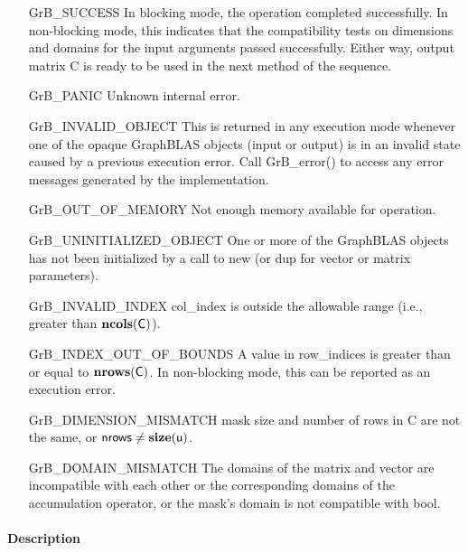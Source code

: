 \begin{itemize}[leftmargin=2.1in]
    \item[{\sf GrB\_SUCCESS}]         In blocking mode, the operation completed
    successfully. In non-blocking mode, this indicates that the compatibility 
    tests on dimensions and domains for the input arguments passed successfully. 
    Either way, output matrix {\sf C} is ready to be used in the next method of 
    the sequence.

    \item[{\sf GrB\_PANIC}]            Unknown internal error.
    
    \item[{\sf GrB\_INVALID\_OBJECT}] This is returned in any execution mode 
    whenever one of the opaque GraphBLAS objects (input or output) is in an invalid 
    state caused by a previous execution error.  Call {GrB\_error()} to access 
    any error messages generated by the implementation.

    \item[{\sf GrB\_OUT\_OF\_MEMORY}]  Not enough memory available for operation.
    
    \item[{\sf GrB\_UNINITIALIZED\_OBJECT}] One or more of the GraphBLAS objects
    has not been initialized by a call to {\sf new} (or {\sf dup} for vector or
    matrix parameters).

    \item[{\sf GrB\_INVALID\_INDEX}]    {\sf col\_index} is outside the allowable 
    range (i.e., greater than $\bold{ncols}({\sf C})$).

    \item[{\sf GrB\_INDEX\_OUT\_OF\_BOUNDS}]  A value in {\sf row\_indices} 
    is greater than or equal to $\bold{nrows}({\sf C})$.  In 
    non-blocking mode, this can be reported as an execution error.
    
    \item[{\sf GrB\_DIMENSION\_MISMATCH}] {\sf mask} size and number of rows
    in {\sf C} are not the same, or ${\sf nrows} \neq \bold{size}({\sf u})$.

    \item[{\sf GrB\_DOMAIN\_MISMATCH}]     The domains of the matrix and vector
    are incompatible with each other or the corresponding domains of the 
    accumulation operator, or the mask's domain is not compatible with bool.
\end{itemize}

\paragraph{Description}

